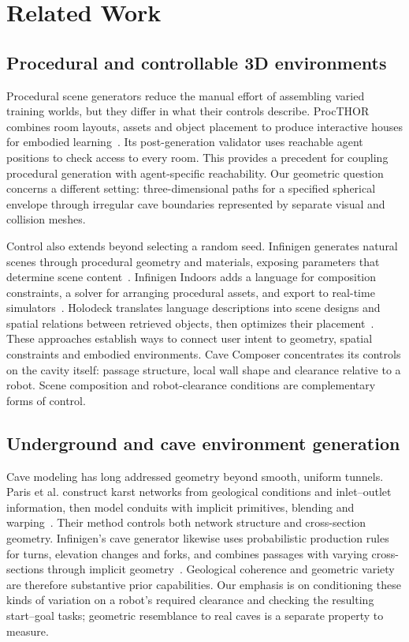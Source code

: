 \section{Related Work}
\subsection{Procedural and controllable 3D environments}
Procedural scene generators reduce the manual effort of assembling varied
training worlds, but they differ in what their controls describe. ProcTHOR
combines room layouts, assets and object placement to produce interactive houses
for embodied learning~\cite{deitke2022procthor}. Its post-generation validator
uses reachable agent positions to check access to every room. This provides a
precedent for coupling procedural generation with agent-specific reachability.
Our geometric question concerns a different setting: three-dimensional paths for a specified
spherical envelope through irregular cave boundaries represented by separate
visual and collision meshes.

Control also extends beyond selecting a random seed. Infinigen generates
natural scenes through procedural geometry and materials, exposing parameters
that determine scene content~\cite{raistrick2023infinigen}. Infinigen Indoors
adds a language for composition constraints, a solver for arranging procedural
assets, and export to real-time simulators~\cite{raistrick2024indoors}.
Holodeck translates language descriptions into scene designs and spatial
relations between retrieved objects, then optimizes their
placement~\cite{yang2024holodeck}. These approaches establish ways to connect
user intent to geometry, spatial constraints and embodied environments.
Cave Composer concentrates its controls on the cavity itself: passage structure,
local wall shape and clearance relative to a robot. Scene composition and
robot-clearance conditions are complementary forms of control.

\subsection{Underground and cave environment generation}
Cave modeling has long addressed geometry beyond smooth, uniform tunnels.
Paris et al. construct karst networks from geological conditions and
inlet--outlet information, then model conduits with implicit primitives,
blending and warping~\cite{paris2021caves}. Their method controls both network
structure and cross-section geometry. Infinigen's cave generator likewise uses
probabilistic production rules for turns, elevation changes and forks, and
combines passages with varying cross-sections through implicit
geometry~\cite{raistrick2023infinigen}. Geological coherence and geometric
variety are therefore substantive prior capabilities. Our emphasis is on
conditioning these kinds of variation on a robot's required clearance and
checking the resulting start--goal tasks; geometric resemblance to real caves
is a separate property to measure.

